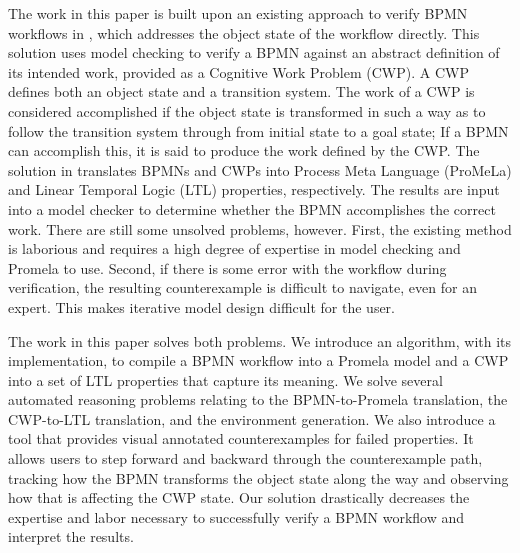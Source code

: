 The work in this paper is built upon an existing approach to verify BPMN workflows in \cite{mercer22}, which addresses the object state of the workflow directly. This solution uses model checking to verify a BPMN against an abstract definition of its intended work, provided as a Cognitive Work Problem (CWP). A CWP defines both an object state and a transition system. The work of a CWP is considered accomplished if the object state is transformed in such a way as to follow the transition system through from initial state to a goal state; If a BPMN can accomplish this, it is said to produce the work defined by the CWP. The solution in \cite{mercer22} translates BPMNs and CWPs into Process Meta Language \cite{promelaManual} (ProMeLa) and Linear Temporal Logic \cite{ltl}  (LTL) properties, respectively. The results are input into a model checker to determine whether the BPMN accomplishes the correct work. There are still some unsolved problems, however. First, the existing method is laborious and requires a high degree of expertise in model checking and Promela to use. Second, if there is some error with the workflow during verification, the resulting counterexample is difficult to navigate, even for an expert. This makes iterative model design difficult for the user. 

The work in this paper solves both problems. We introduce an algorithm, with its implementation, to compile a BPMN workflow into a Promela model and a CWP into a set of LTL properties that capture its meaning. We solve several automated reasoning problems relating to the BPMN-to-Promela translation, the CWP-to-LTL translation, and the environment generation. We also introduce a tool that provides visual annotated counterexamples for failed properties. It allows users to step forward and backward through the counterexample path, tracking how the BPMN transforms the object state along the way and observing how that is affecting the CWP state. Our solution drastically decreases the expertise and labor necessary to successfully verify a BPMN workflow and interpret the results. 

\begin{comment}
This work progresses the path toward high-integrity LC/NC solution designs by automating a process which allows BPMN models to be verified against a CWP. The CWP has two parts, an object state and a state machine; the former connects it to the BPMN workflow model. The goal of the verification process is to test whether the BPMN workflow can manipulate the object state toward any of the final states specified by the CWP state machine. Verification must also ensure that the BPMN workflow uses only allowed transitions to reach a final state.
\end{comment}

